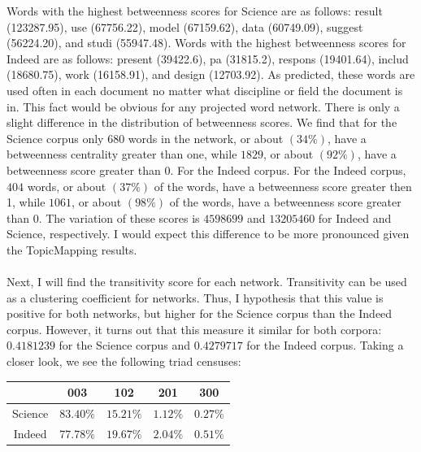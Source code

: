 \documentclass[12pt]{article}
\begin{document}
\noindent Words with the highest betweenness scores for Science are as follows:  result (123287.95), use (67756.22), model (67159.62), data (60749.09), suggest (56224.20), and studi (55947.48). Words with the highest betweenness scores for Indeed are as follows:  present (39422.6), pa (31815.2), respons (19401.64), includ (18680.75), work (16158.91), and design (12703.92). As predicted, these words are used often in each document no matter what discipline or field the document is in. This fact would be obvious for any projected word network. There is only a slight difference in the distribution of betweenness scores. We find that for the Science corpus only $680$ words in the network, or about $(34\%)$, have a betweenness centrality greater than one, while $1829$, or about $(92\%)$, have a betweenness score greater than $0$. For the Indeed corpus. For the Indeed corpus, $404$ words, or about $(37\%)$ of the words, have a betweenness score greater then 1, while $1061$, or about $(98\%)$ of the words, have a betweenness score greater than 0. The variation of these scores is $4598699$ and $13205460$ for Indeed and Science, respectively. I would expect this difference to be more pronounced given the TopicMapping results. 
\\
\\
Next, I will find the transitivity score for each network. Transitivity can be used as a clustering coefficient for networks. Thus, I hypothesis that this value is positive for both networks, but higher for the Science corpus than the Indeed corpus. However, it turns out that this measure it similar for both corpora:  $0.4181239$ for the Science corpus and $0.4279717$ for the Indeed corpus. Taking a closer look, we see the following triad censuses:
\vspace{2mm}
\begin{center}
	\begin{tabular}{ |c||c|c|c|c|  }
		\hline
		&003&102&201&300 \\ 
		\hline 
		Science& $83.40\%$ & $15.21\%$ & $1.12\%$ & $0.27\%$ \\
		Indeed& $77.78\%$ & $19.67\%$ & $2.04\%$ & $0.51\%$ \\
		\hline
	\end{tabular}
\end{center}
\vspace{2mm}
\end{document}
